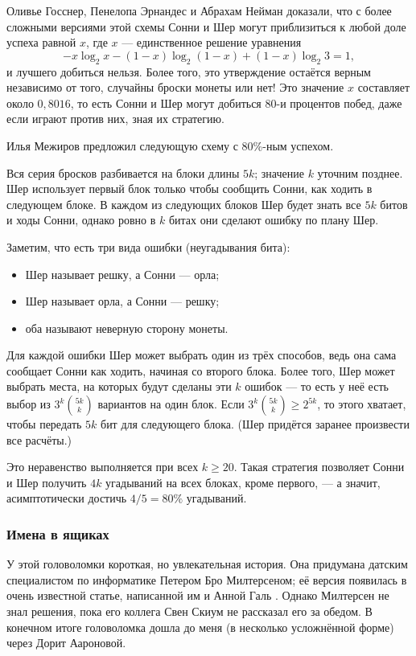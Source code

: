 Оливье Госснер, Пенелопа Эрнандес и Абрахам Нейман \cite{32} доказали, что с более сложными версиями этой схемы Сонни и Шер могут приблизиться к любой доле успеха равной $x$, где $x$ --- единственное решение уравнения
\[-x \log_2 x - (1 - x) \log_2 (1 - x) + (1 - x) \log_2 3 = 1,\]
и лучшего добиться нельзя.
Более того, это утверждение остаётся верным независимо от того, случайны броски монеты или нет!
Это значение $x$ составляет около $0{,}8016$, то есть Сонни и Шер могут добиться  $80$-и процентов побед, даже если играют против них, зная их стратегию.

\begin{addedbytheeditors}
Илья Межиров предложил следующую схему с 80\%-ным успехом.

Вся серия бросков разбивается на блоки длины $5k$; значение $k$ уточним позднее.
Шер использует первый блок только чтобы сообщить Сонни, как ходить в следующем блоке.
В каждом из следующих блоков Шер будет знать все $5k$ битов и ходы Сонни,
однако ровно в $k$ битах они сделают ошибку по плану Шер. 

Заметим, что есть три вида ошибки (неугадывания бита): 
\begin{itemize}
\item Шер называет решку, а Сонни --- орла;
\item Шер называет орла, а Сонни --- решку;
\item оба называют неверную сторону монеты.
\end{itemize}
Для каждой ошибки Шер может выбрать один из трёх способов,
ведь она сама сообщает Сонни как ходить, начиная со второго блока.
Более того, Шер может выбрать места, на которых будут сделаны эти $k$ ошибок --- то есть
у неё есть выбор из $3^k \binom{5k}{k}$ вариантов на один блок.
Если $3^k \binom{5k}{k}\ge 2^{5k}$, то этого хватает, чтобы передать $5k$ бит для следующего блока.
(Шер придётся заранее произвести все расчёты.) 

Это неравенство выполняется при всех $k\ge 20$.
Такая стратегия позволяет Сонни и Шер получить $4k$ угадываний на всех блоках, кроме первого, --- а значит, асимптотически достичь $4/5=80\%$ угадываний.
\pr
\end{addedbytheeditors}


\subsubsection*{Имена в ящиках}

У этой головоломки короткая, но увлекательная история.
Она придумана датским специалистом по информатике Петером Бро Милтерсеном;
её версия появилась в очень известной статье, написанной им и Анной Галь \cite{21}.
Однако Милтерсен не знал  решения, пока его коллега Свен Скиум не рассказал его за обедом.
В конечном итоге головоломка дошла до меня (в несколько усложнённой форме) через Дорит Аароновой.

